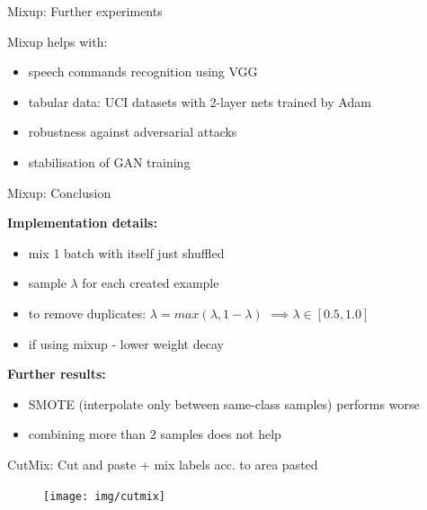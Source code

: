 \documentclass{beamer}
\begin{document}
\begin{frame}{Mixup: Further experiments}

Mixup helps with:
\begin{itemize}
\item speech commands recognition using VGG
\item tabular data: UCI datasets with 2-layer nets trained by Adam
\item robustness against adversarial attacks
\item stabilisation of GAN training
\end{itemize}

\end{frame}
\begin{frame}{Mixup: Conclusion}

\textbf{Implementation details:}
\begin{itemize}
\item mix 1 batch with itself just shuffled
\item sample $\lambda$ for each created example
\item to remove duplicates: $\lambda = max(\lambda, 1 - \lambda)$ $\implies \lambda \in [0.5, 1.0]$ 
\item if using mixup - lower weight decay
\end{itemize}

\vfill

\textbf{Further results:}
\begin{itemize}
\item SMOTE (interpolate only between same-class samples) performs worse
\item combining more than 2 samples does not help
\end{itemize}

\end{frame}

\begin{frame}{CutMix: Cut and paste + mix labels acc. to area pasted}

\begin{figure}[h]
\texttt{[image: img/cutmix]}
\end{figure}

\end{frame}
\end{document}
